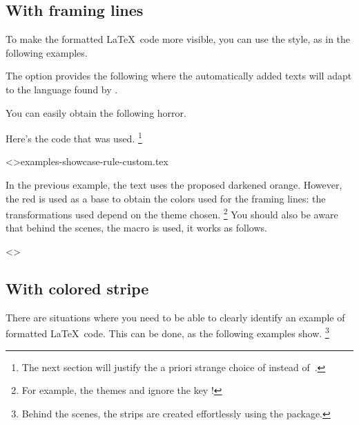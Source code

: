 \subsection{With framing lines}

To make the formatted \LaTeX\ code more visible, you can use the  style, as in the following examples.


\begin{tdocexa}
	The option  provides the following where the automatically added texts will adapt to the language found by \thisproj.

	
\end{tdocexa}


\begin{tdocexa}
	You can easily obtain the following horror.

	

	Here's the code that was used.%
	\footnote{
		The next section will justify the a priori strange choice of  instead of \,.
	}

	\tdoclatexinput<>{examples-showcase-rule-custom.tex}
\end{tdocexa}


\begin{tdocnote}
    In the previous example, the text uses the proposed darkened orange. However, the red is used as a base to obtain the colors used for the framing lines: the transformations used depend on the theme chosen.%
    \footnote{
        For example, the themes  and  ignore the key !
    }
    You should also be aware that behind the scenes, the macro  is used, it works as follows.

    \begin{tdoclatex}<>
    \end{tdoclatex}
\end{tdocnote}


\subsection{With colored stripe}

There are situations where you need to be able to clearly identify an example of formatted \LaTeX\ code. This can be done, as the following examples show.%
\footnote{
    Behind the scenes, the strips are created effortlessly using the  package.
}


